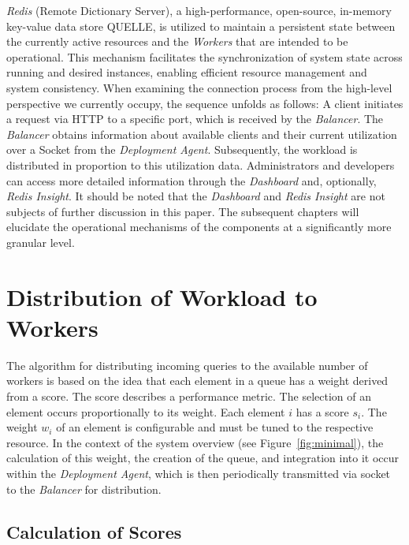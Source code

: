\documentclass[twocolumn]{webofc}
\begin{document}
\textit{Redis} (Remote Dictionary Server), a high-performance, open-source, in-memory key-value data store {\color{red} QUELLE}, is utilized to maintain a persistent state between the currently active resources and the \textit{Workers} that are intended to be operational. This mechanism facilitates the synchronization of system state across running and desired instances, enabling efficient resource management and system consistency. When examining the connection process from the high-level perspective we currently occupy, the sequence unfolds as follows: A client initiates a request via HTTP to a specific port, which is received by the \textit{Balancer}. The \textit{Balancer} obtains information about available clients and their current utilization over a Socket from the \textit{Deployment Agent}. Subsequently, the workload is distributed in proportion to this utilization data.
Administrators and developers can access more detailed information through the \textit{Dashboard} and, optionally, \textit{Redis Insight}. It should be noted that the \textit{Dashboard} and \textit{Redis Insight} are not subjects of further discussion in this paper.
The subsequent chapters will elucidate the operational mechanisms of the components at a significantly more granular level.

\section{Distribution of Workload to Workers}
The algorithm for distributing incoming queries to the available number of workers is based on the idea that each element in a queue has a weight derived from a score. The score describes a performance metric. The selection of an element occurs proportionally to its weight. Each element \(i\) has a score \(s_i\). The weight \(w_i\) of an element is configurable and must be tuned to the respective resource. In the context of the system overview (see Figure~\ref{fig:minimal}), the calculation of this weight, the creation of the queue, and integration into it occur within the \textit{Deployment Agent}, which is then periodically transmitted via socket to the \textit{Balancer} for distribution.

\newpage
\subsection{Calculation of Scores}
\end{document}
